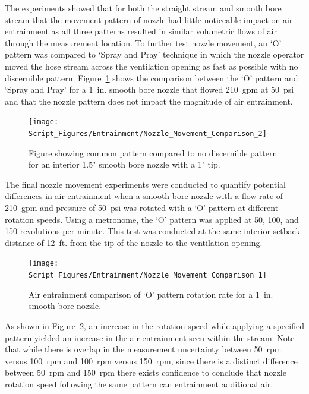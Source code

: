\documentclass[12pt,oneside]{book}
\begin{document}
The experiments showed that for both the straight stream and smooth bore stream that the movement pattern of nozzle had little noticeable impact on air entrainment as all three patterns resulted in similar volumetric flows of air through the measurement location. To further test nozzle movement, an `O' pattern was compared to `Spray and Pray' technique in which the nozzle operator moved the hose stream across the ventilation opening as fast as possible with no discernible pattern. Figure~\ref{fig:Nozzle_Movement_PatterntoNoPattern_Comparison} shows the comparison between the `O' pattern and `Spray and Pray' for a 1~in. smooth bore nozzle that flowed 210~gpm at 50~psi and that the nozzle pattern does not impact the magnitude of air entrainment. 

\begin{figure}[!ht]
\centering
\texttt{[image: Script\_Figures/Entrainment/Nozzle\_Movement\_Comparison\_2]}
\caption[Air Entrainment Comparison of `O' Pattern Versus `Spray and Pray']{Figure showing common pattern compared to no discernible pattern for an interior 1.5" smooth bore nozzle with a 1" tip.}
\label{fig:Nozzle_Movement_PatterntoNoPattern_Comparison}
\end{figure}

The final nozzle movement experiments were conducted to quantify potential differences in air entrainment when a smooth bore nozzle with a flow rate of 210~gpm and pressure of 50~psi was rotated with a `O' pattern at different rotation speeds. Using a metronome, the `O' pattern was applied at 50, 100, and 150 revolutions per minute. This test was conducted at the same interior setback distance of 12~ft. from the tip of the nozzle to the ventilation opening.

\begin{figure}[!ht]
\centering
\texttt{[image: Script\_Figures/Entrainment/Nozzle\_Movement\_Comparison\_1]}
\caption[Air Entrainment Comparison of Pattern Rotation Rate]{Air entrainment comparison of `O' pattern rotation rate for a 1~in. smooth bore nozzle.}
\label{fig:Nozzle_Movement_RotationSpeed_Comparison}
\end{figure}

As shown in Figure~\ref{fig:Nozzle_Movement_RotationSpeed_Comparison}, an increase in the rotation speed while applying a specified pattern yielded an increase in the air entrainment seen within the stream. Note that while there is overlap in the measurement uncertainty between 50~rpm versus 100~rpm and 100~rpm versus 150~rpm, since there is a distinct difference between 50~rpm and 150~rpm there exists confidence to conclude that nozzle rotation speed following the same pattern can entrainment additional air.
\end{document}
